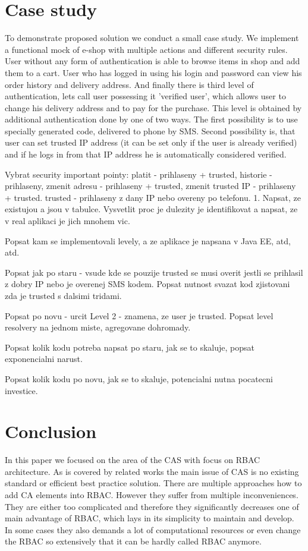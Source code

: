 \documentclass{sig-alternate}
\begin{document}
\section{Case study}
To demonstrate proposed solution we conduct a small case study. We implement a functional mock of e-shop with multiple actions and different security rules. User without any form of authentication is able to browse items in shop and add them to a cart. User who has logged in using his login and password can view his order history and delivery address. And finally there is third level of authentication, lets call user possessing it 'verified user', which allows user to change his delivery address and to pay for the purchase. This level is obtained by additional authentication done by one of two ways. The first possibility is to use specially generated code, delivered to phone by SMS. Second possibility is, that user can set trusted IP address (it can be set only if the user is already verified) and if he logs in from that IP address he is automatically considered verified.

Vybrat security important pointy: platit - prihlaseny + trusted, historie - prihlaseny, zmenit adresu - prihlaseny + trusted, zmenit trusted IP - prihlaseny + trusted. trusted - prihlaseny z dany IP nebo overeny po telefonu. 1. Napsat, ze existujou a jsou v tabulce. Vysvetlit proc je dulezity je identifikovat a napsat, ze v real aplikaci je jich mnohem vic.

Popsat kam se implementovali levely, a ze aplikace je napsana v Java EE, atd, atd.

Popsat jak po staru - vsude kde se pouzije trusted se musi overit jestli se prihlasil z dobry IP nebo je overenej SMS kodem. Popsat nutnost svazat kod zjistovani zda je trusted s dalsimi tridami.

Popsat po novu - urcit Level 2 - znamena, ze user je trusted. Popsat level resolvery na jednom miste, agregovane dohromady.

Popsat kolik kodu potreba napsat po staru, jak se to skaluje, popsat exponencialni narust.

Popsat kolik kodu po novu, jak se to skaluje, potencialni nutna pocatecni investice.

\section{Conclusion}
In this paper we focused on the area of the CAS with focus on RBAC architecture. As is covered by related works the main issue of CAS is no existing standard or efficient best practice solution. There are multiple approaches how to add CA elements into RBAC. However they suffer from multiple inconveniences. They are either too complicated and therefore they significantly decreases one of main advantage of RBAC, which lays in its simplicity to maintain and develop. In some cases they also demands a lot of computational resources or even change the RBAC so extensively that it can be hardly called RBAC anymore.
\end{document}
